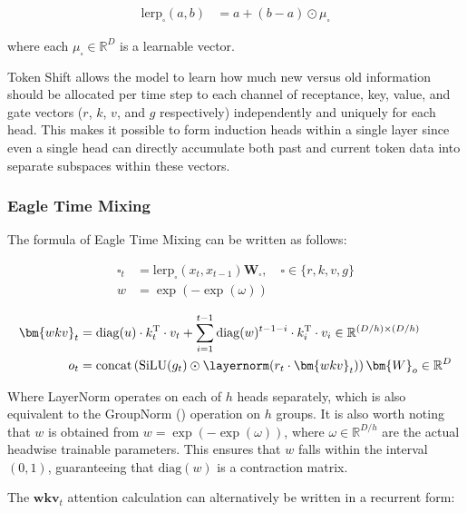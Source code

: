 \begin{align}
\label{eq:lerp5}
\mathrm{lerp}_\square (a, b) &= a + (b-a) \odot \mu_\square
\end{align}

where each $\mu_\square\in\mathbb{R}^{D}$ is a learnable vector.

Token Shift allows the model to learn how much new versus old information should be allocated per time step to each channel of receptance, key, value, and gate vectors ($r$, $k$, $v$, and $g$ respectively) independently and uniquely for each head. This makes it possible to form induction heads \citep{elhage2021mathematical} within a single layer since even a single head can directly accumulate both past and current token data into separate subspaces within these vectors.

\subsubsection{Eagle Time Mixing}

The formula of Eagle Time Mixing can be written as follows:

\begin{align}\label{eq:token-shift5}
\square_{t} &= \mathrm{lerp}_{\square}(x_t, x_{t-1})\bm{W}_{\square}, \quad \square\in \{r,k,v,g\}\\
w &= \exp(-\exp(\omega))
\end{align}

\begin{align}
\label{eq:time-mix5}
\bm{wkv}_{t} &= \mathrm{diag}(u)\cdot k_{t}^\mathrm{T} \cdot v_{t} + \sum_{i=1}^{t-1} \mathrm{diag}(w)^{t-1-i} \cdot  k_{i}^\mathrm{T} \cdot v_{i}  \in \mathbb{R}^{(D/h) \times (D/h)}  \\
  \label{eq:time-mixer5out}
o_t &= \mathrm{concat}\left(\mathrm{SiLU}(g_t) \odot \layernorm(r_{t}  \cdot \bm{wkv}_{t})\right) \bm{W}_o \in \mathbb{R}^{D}
\end{align}

Where LayerNorm operates on each of $h$ heads separately, which is also equivalent to the GroupNorm (\cite{wu2018group}) operation on $h$ groups. It is also worth noting that $w$ is obtained from $w = \exp(-\exp(\omega))$, where $\omega \in \mathbb{R}^{D/h}$ are the actual headwise trainable parameters. This ensures that $w$ falls within the interval $(0,1)$, guaranteeing that $\mathrm{diag}(w)$ is a contraction matrix. 

The $\bm{wkv}_{t}$ attention calculation can alternatively be written in a recurrent form:

